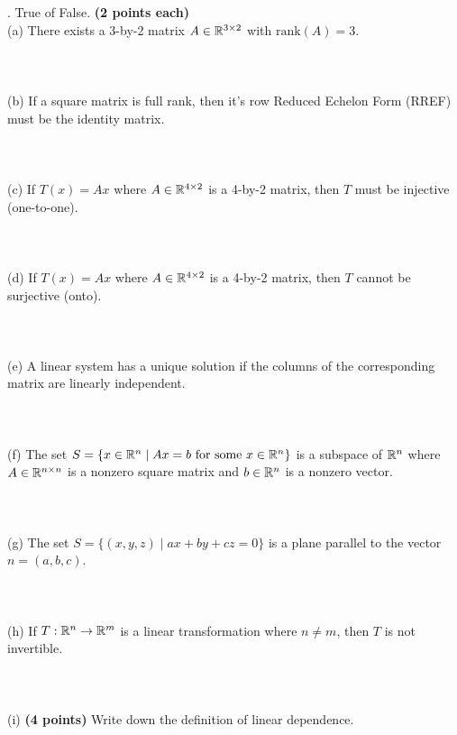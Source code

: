 \documentclass[12pt,a4paper]{article}
\newcommand{\gray}[1]{\textcolor{gray}{}}
\newcommand{\ra}[1]{\ifnum #1=1\rightarrow\fi\ifnum #1=2\Rightarrow\fi\ifnum #1=3\Rrightarrow\fi\ifnum #1=4\rightrightarrows\fi\ifnum #1=5\rightleftarrows\fi\ifnum #1=6\mapsto\fi\ifnum #1=7\iffalse\fi\fi\ifnum #1=8\twoheadrightarrow\fi\ifnum #1=9\rightharpoonup\fi\ifnum #1=0\rightharpoondown\fi}
\newcommand{\x}{\times}
\def\R{\ifmmode\mathbb R\fi}
\begin{document}
. True of False. \textbf{(2 points each)}\\
(a) There exists a 3-by-2 matrix $A \in \R^{3\x 2}$ with $\mbox{rank}(A) = 3$.\\
\gray{false}
\\
\\
\\
(b) If a square matrix is full rank, then it's row Reduced Echelon Form (RREF) must be the identity matrix. \\
\gray{true}
\\
\\
\\
(c) If $T(x) = Ax$ where $A \in \R^{4\x 2}$ is a 4-by-2 matrix, then $T$ must be injective (one-to-one). \\
\gray{false}
\\
\\
\\
(d) If $T(x) = Ax$ where $A \in \R^{4\x 2}$ is a 4-by-2 matrix, then $T$ cannot be surjective (onto). \\
\gray{true}
\\
\\
\\
(e) A linear system has a unique solution if the columns of the corresponding matrix are linearly independent. \\
\gray{false. Consider 3-by-2 linear system}
\\
\\
\\
(f) The set $S = \{x \in \R^n \mid Ax = b \mbox{ for some } x\in \R^n\}$ is a subspace of $\R^n$ where $A \in \R^{n\x n}$ is a nonzero square matrix and $b\in\R^n$ is a nonzero vector.  \\
\gray{false}
\\
\\
\\
(g) The set $S = \{(x, y, z) \mid ax+by+cz = 0\}$ is a plane parallel to the vector $n = (a, b, c)$. \\
\gray{false}
\\
\\
\\
(h) If $T: \R^n \ra1 \R^m$ is a linear transformation where $n \neq m$, then $T$ is not invertible. \\
\gray{true} \\
\\
\\
(i) \textbf{(4 points)} Write down the definition of linear dependence. \\
\gray{A set of vector $S = \{v_1, \cdots, v_k\}$ is linear dependent if there exist nontrivial scalars $\alpha_1, \cdots, \alpha_k \in \R$ such that 
$$ \alpha_1 v_1 + \cdots + \alpha_k v_k = 0.$$
}
\end{document}
